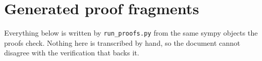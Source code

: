 \section{Generated proof fragments}
\label{sec:generated}

Everything below is written by \texttt{run\_proofs.py} from the same sympy objects the proofs
check. Nothing here is transcribed by hand, so the document cannot disagree with the
verification that backs it.





